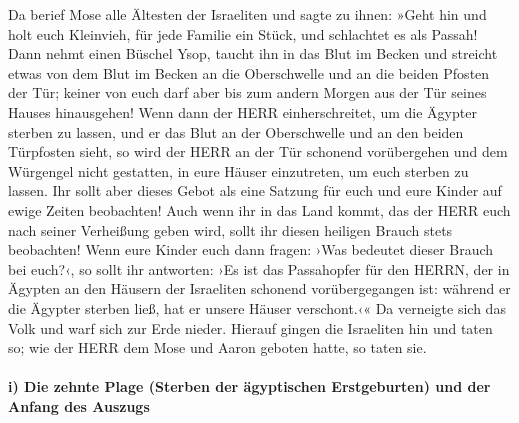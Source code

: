 Da berief Mose alle Ältesten der Israeliten und sagte zu
ihnen: »Geht hin und holt euch Kleinvieh, für jede Familie ein Stück,
und schlachtet es als Passah!  Dann nehmt einen Büschel
Ysop, taucht ihn in das Blut im Becken und streicht etwas von dem Blut
im Becken an die Oberschwelle und an die beiden Pfosten der Tür; keiner
von euch darf aber bis zum andern Morgen aus der Tür seines Hauses
hinausgehen!  Wenn dann der HERR einherschreitet, um die
Ägypter sterben zu lassen, und er das Blut an der Oberschwelle und an
den beiden Türpfosten sieht, so wird der HERR an der Tür schonend
vorübergehen und dem Würgengel nicht gestatten, in eure Häuser
einzutreten, um euch sterben zu lassen.  Ihr sollt aber
dieses Gebot als eine Satzung für euch und eure Kinder auf ewige Zeiten
beobachten!  Auch wenn ihr in das Land kommt, das der
HERR euch nach seiner Verheißung geben wird, sollt ihr diesen heiligen
Brauch stets beobachten!  Wenn eure Kinder euch dann
fragen: ›Was bedeutet dieser Brauch bei euch?‹,  so sollt
ihr antworten: ›Es ist das Passahopfer für den HERRN, der in Ägypten an
den Häusern der Israeliten schonend vorübergegangen ist: während er die
Ägypter sterben ließ, hat er unsere Häuser verschont.‹« Da verneigte
sich das Volk und warf sich zur Erde nieder.  Hierauf
gingen die Israeliten hin und taten so; wie der HERR dem Mose und Aaron
geboten hatte, so taten sie.

\hypertarget{i-die-zehnte-plage-sterben-der-uxe4gyptischen-erstgeburten-und-der-anfang-des-auszugs}{%
\paragraph{i) Die zehnte Plage (Sterben der ägyptischen Erstgeburten)
und der Anfang des
Auszugs}\label{i-die-zehnte-plage-sterben-der-uxe4gyptischen-erstgeburten-und-der-anfang-des-auszugs}}

